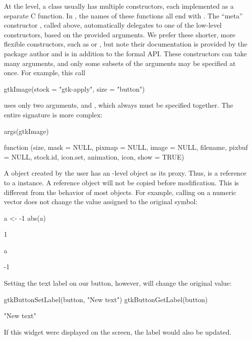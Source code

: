 At the \GTK\/ level, a class usually has multiple constructors, each
implemented as a separate C function. In , the names of
these functions all end with . The ``meta'' constructor
, called above, automatically delegates to one of
the low-level constructors, based on the provided arguments.
We prefer these shorter, more flexible constructors, such as
 or , but note their
documentation is provided by the \R\/ package author and is in
addition to the formal API. These constructors can take many
arguments, and only some subsets of the arguments may be specified at
once. For example, this call
\begin{Schunk}
\begin{Sinput}
 gtkImage(stock = "gtk-apply", size = "button")
\end{Sinput}
\end{Schunk}
% 
uses only two arguments,  and
, which always must be specified
together. The entire signature is more complex:
\begin{Schunk}
\begin{Sinput}
 args(gtkImage)
\end{Sinput}
\end{Schunk}
\begin{Soutput}
function (size, mask = NULL, pixmap = NULL, image = NULL, 
    filename, pixbuf = NULL, stock.id, icon.set, animation, 
    icon, show = TRUE)  
\end{Soutput}
A \GTK\/ object created by the \R\/ user has an \R-level object as its
proxy. Thus,  is a reference to a 
instance. A reference object will not be copied before
modification. This is different from the behavior of most \R\/
objects. For example, calling  on a numeric vector does
not change the value assigned to the original symbol:
\begin{Schunk}
\begin{Sinput}
 a <- -1
 abs(a)
\end{Sinput}
\begin{Soutput}
[1] 1
\end{Soutput}
\begin{Sinput}
 a
\end{Sinput}
\begin{Soutput}
[1] -1
\end{Soutput}
\end{Schunk}
% 
Setting the text label on our button, however, will change the
original value:
\begin{Schunk}
\begin{Sinput}
 gtkButtonSetLabel(button, "New text")
 gtkButtonGetLabel(button)
\end{Sinput}
\begin{Soutput}
[1] "New text"
\end{Soutput}
\end{Schunk}
% 
If this widget were displayed on the screen, the label would also be
updated.

